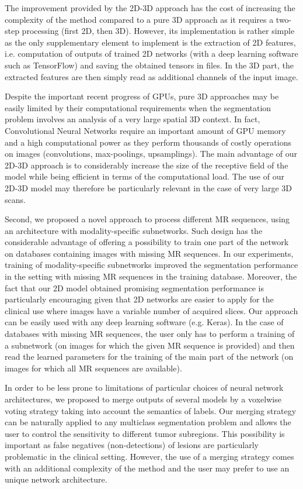 \documentclass[preprint,12pt]{elsarticle}
\begin{document}
The improvement provided by the 2D-3D approach has the cost of increasing the complexity of the method compared to a pure 3D approach as it requires a two-step processing (first 2D, then 3D). However, its implementation is rather simple as the only supplementary element to implement is the extraction of 2D features, i.e. computation of outputs of trained 2D networks (with a deep learning software such as TensorFlow) and saving the obtained tensors in files. In the 3D part, the extracted features are then simply read as additional channels of the input image.


Despite the important recent progress of GPUs, pure 3D approaches may be easily limited by their computational requirements when the segmentation problem involves an analysis of a very large spatial 3D context. In fact, Convolutional Neural Networks require an important amount of GPU memory and a high computational power as they perform thousands of costly operations on images (convolutions, max-poolings, upsamplings). The main advantage of our 2D-3D approach is to considerably increase the size of the receptive field of the model while being efficient in terms of the computational load. The use of our 2D-3D model may therefore be particularly relevant in the case of very large 3D scans.


Second, we proposed a novel approach to process different MR sequences, using an architecture with modality-specific subnetworks. Such design has the considerable advantage of offering a possibility to train one part of the network on databases containing images with missing MR sequences. 
In our experiments, training of modality-specific subnetworks improved the segmentation performance in the setting with missing MR sequences in the training database. Moreover, the fact that our 2D model obtained promising segmentation performance is particularly encouraging given that 2D networks are easier to apply for the clinical use where images have a variable number of acquired slices. Our approach can be easily used with any deep learning software (e.g. Keras). In the case of databases with missing MR sequences, the user only has to perform a training of a subnetwork (on images for which the given MR sequence is provided) and then read the learned parameters for the training of the main part of the network (on images for which all MR sequences are available).

In order to be less prone to limitations of particular choices of neural network architectures, we proposed to merge outputs of several models by a voxelwise voting strategy taking into account the semantics of labels. Our merging strategy can be naturally applied to any multiclass segmentation problem and allows the user to control the sensitivity to different tumor subregions. This possibility is important as false negatives (non-detections) of lesions are particularly problematic in the clinical setting. However, the use of a merging strategy comes with an additional complexity of the method and the user may prefer to use an unique network architecture.
\end{document}
